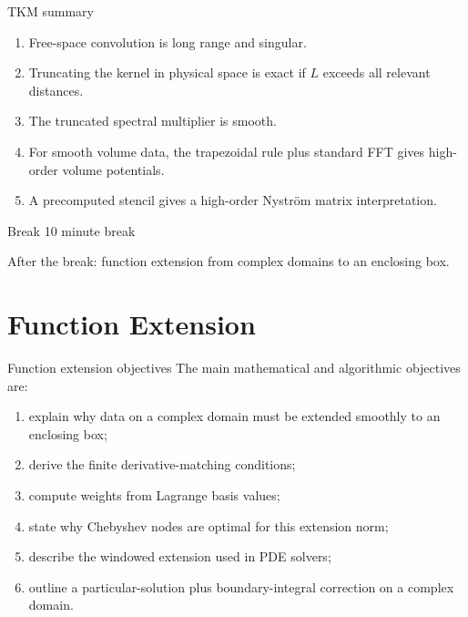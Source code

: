 \documentclass[aspectratio=169,11pt]{beamer}
\begin{document}
\begin{frame}{TKM summary}
\small
\begin{enumerate}
  \item Free-space convolution is long range and singular.
  \item Truncating the kernel in physical space is exact if $L$ exceeds all relevant distances.
  \item The truncated spectral multiplier is smooth.
  \item For smooth volume data, the trapezoidal rule plus standard FFT gives
  high-order volume potentials.
  \item A precomputed stencil gives a high-order Nystr\"om matrix interpretation.
\end{enumerate}
\end{frame}

\begin{frame}{Break}
\centering
\vspace{18mm}
{\Large 10 minute break}

\vspace{8mm}
After the break: function extension from complex domains to an enclosing box.
\end{frame}

\section{Function Extension}

\begin{frame}{Function extension objectives}
\small
The main mathematical and algorithmic objectives are:
\begin{enumerate}
  \item explain why data on a complex domain must be extended smoothly to an enclosing box;
  \item derive the finite derivative-matching conditions;
  \item compute weights from Lagrange basis values;
  \item state why Chebyshev nodes are optimal for this extension norm;
  \item describe the windowed extension used in PDE solvers;
  \item outline a particular-solution plus boundary-integral correction on a complex domain.
\end{enumerate}
\end{frame}
\end{document}
